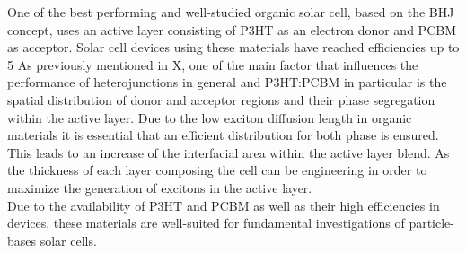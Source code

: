 \documentclass[letterpaper, 10 pt, conference]{ieeeconf}
\begin{document}
One of the best performing and well-studied organic solar cell, based on the BHJ concept, uses an active layer consisting of P3HT as an electron donor and PCBM as acceptor.  Solar cell devices using these materials have reached efficiencies up to 5%
As previously mentioned in X, one of the main factor that influences the performance of heterojunctions in general and P3HT:PCBM in particular is the spatial distribution of donor and acceptor regions and their phase segregation within the active layer. Due to the low exciton diffusion length in organic materials it is essential that an efficient distribution for both phase is ensured. This leads to an increase of the interfacial area within the active layer blend. As the thickness of each layer composing the cell can be engineering in order to maximize the generation of excitons in the active layer. \\
Due to the availability of P3HT and PCBM as well as their high efficiencies in devices, these materials are well-suited for fundamental investigations of particle-bases solar cells.
\end{document}
